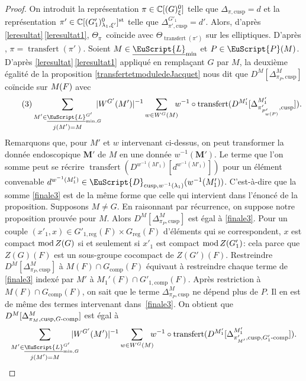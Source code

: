 \documentclass[JEP,XML,SOM,Unicode,francais]{cedram}
\let\mathcal \EuScript
\newcommand{\NoChangel}[1]{%
\expandafter\let\csname old\string#1\endcsname=#1
\let#1=\relax
\newcommand{#1}{\mathcode`l="716C\csname old\string#1\endcsname\mathcode`l="7160 }%
}
\newcommand{\rmod}{\textup{mod}\,}
\newcommand{\comp}{\mathrm{comp}}
\newcommand{\tcomp}{\textup{-comp}}
\newcommand{\cusp}{\mathrm{cusp}}
\newcommand{\rell}{\mathrm{ell}} \NoChangel{\rell}
\newcommand{\Ell}{\mathrm{Ell}} \NoChangel{\Ell}
\newcommand{\trel}{\textup{-rel}} \NoChangel{\trel}
\newcommand{\reg}{\mathrm{reg}}
\newcommand{\st}{\mathrm{st}}
\DeclareMathOperator{\transfert}{transfert}
\newcommand{\bM}{\boldsymbol{M}}
\newcommand{\cD}{\mathcal{D}}
\newcommand{\cL}{\mathcal{L}}
\newcommand{\cP}{\mathcal{P}}
\newcommand{\CC}{\mathbb{C}}
\theoremstyle{plain}
\theoremstyle{definition}
\begin{document}
\begin{proof}
On introduit la représentation $\pi\in \CC[\Ell(G)_{\xi}^0]$ telle que $\Delta_{\pi,\cusp}=d$ et la représentation $\pi'\in \CC[\Ell(G'_{1})^0_{\lambda_{1},\xi'}]^{\st}$ telle que $\Delta^{G'_{1}}_{\pi',\cusp}=d'$. Alors, d'après \ref{leresultat}\,\eqref{leresultat1}, $\Theta_{\pi}$~coïncide avec $\Theta_{\transfert(\pi')}$ sur les elliptiques. D'après \cite[Th.\,6.2]{A3}, $\pi=\transfert(\pi')$. Soient $M\in \underline{\cL}_{\min}$ et $P\in \cP(M)$. D'après \ref{leresultat}\,\eqref{leresultat1} appliqué en remplaçant $G$ par $M$, la deuxième égalité de la proposition \ref{transfertetmoduledeJacquet} nous dit que $D^M[\Delta^M_{\pi_{P},\cusp}]$ coïncide sur $M_{\rell}(F)$ avec
\begin{equation}\tag{3}\label{finale3}
\sum_{\substack{M'\in \underline{\cL}_{\min,G\trel}^{G'}\\ j(M')=M}}\hspace*{-3mm}\vert W^{G'}(M')\vert ^{-1}\sum_{w\in W^{G}(M)}\hspace*{-2mm}w^{-1}\circ \transfert( D^{M'_{1}}[\Delta^{M'_{1}}_{\pi'_{P'_{w(P)}},\cusp}]).
\end{equation}
Remarquons que, pour $M'$ et $w$ intervenant ci-dessus, on peut transformer la donnée endoscopique $\bM'$ de $M$ en une donnée $w^{-1}(\bM')$. Le terme que l'on somme peut se récrire $\transfert(D^{w^{-1}(M'_{1})}[d^{w^{-1}(M'_{1})}])$ pour un élément convenable $d^{w^{-1}(M'_{1})}\in \cD_{\cusp,w^{-1}(\lambda_{1})}(w^{-1}(M'_{1}))$. C'est-à-dire que la somme \eqref{finale3} est de la même forme que celle qui intervient dans l'énoncé de la proposition.
Supposons $M\neq G$. En raisonnant par récurrence, on suppose notre proposition prouvée pour $M$. Alors $D^M[\Delta^M_{\pi_{P},\cusp}]$ est égal à \eqref{finale3}. Pour un couple $(x'_{1},x)\in G'_{1,\reg}(F)\times G_{\reg}(F)$ d'éléments qui se correspondent, $x$ est compact $\rmod Z(G)$ si et seulement si $x'_{1}$ est compact $\rmod Z(G'_{1})$: cela parce
que $Z(G)(F)$ est un sous-groupe cocompact de $Z(G')(F)$. Restreindre $D^M[\Delta^M_{\pi_{P},\cusp}]$ à $M(F)\cap G_{\comp}(F)$ équivaut à restreindre chaque terme de \eqref{finale3} indexé par $M'$ à $M_{1}'(F)\cap G'_{1,\comp}(F)$. Après restriction à $M(F)\cap G_{\comp}(F)$, on sait que le terme $\Delta^M_{\pi_{P},\cusp}$ ne dépend plus de $P$. Il en est de même des termes intervenant dans~\eqref{finale3}. On obtient que $D^M[\Delta^M_{\pi_{M},\cusp,G\tcomp}]$ est égal à
\[
\sum_{\substack{M'\in \underline{\cL}_{\min,G\trel}^{G'}\\ j(M')=M}}\hspace*{-4mm}\vert W^{G'}(M')\vert ^{-1}\sum_{w\in W^{G}(M)} \hspace*{-2mm}w^{-1}\circ \transfert(D^{M'_{1}}[\Delta^{M'_{1}}_{\pi'_{M'},\cusp,G'_{1}\tcomp}]).
\]
\end{proof}
\end{document}
